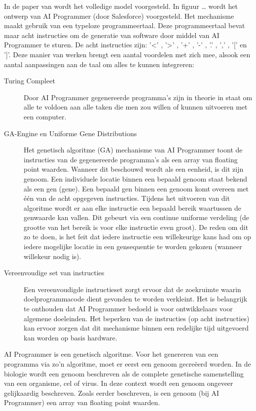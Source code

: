 In de paper van \textcite{aiProgrammer} wordt het volledige model voorgesteld. In figuur … wordt het ontwerp van AI Programmer (door Salesforce) voorgesteld. Het mechanisme maakt gebruik van een typeloze programmeertaal. Deze programmeertaal bevat maar acht instructies om de generatie van software door middel van AI Programmer te sturen. De acht instructies zijn: '<' , '>' , '+' , '-' , '.' , ',' , '[' en ']'. Deze manier van werken brengt een aantal voordelen met zich mee, alsook een aantal aanpassingen aan de taal om alles te kunnen integreren:
\begin{description}
	\item[Turing Compleet] Door AI Programmer gegenereerde programma’s zijn in theorie in staat om alle te voldoen aan alle taken die men zou willen of kunnen uitvoeren met een computer.
	\item[GA-Engine en Uniforme Gene Distributions] Het genetisch algoritme (GA) mechanisme van AI Programmer toont de instructies van de gegenereerde programma’s als een array van floating point waarden. Wanneer dit beschouwd wordt als een eenheid, is dit zijn genoom. Een individuele locatie binnen een bepaald genoom staat bekend als een gen (gene). Een bepaald gen binnen een genoom komt overeen met één van de acht opgegeven instructies. Tijdens het uitvoeren van dit algoritme wordt er aan elke instructie een bepaald bereik waartussen de genwaarde kan vallen. Dit gebeurt via een continue uniforme verdeling (de grootte van het bereik is voor elke instructie even groot). De reden om dit zo te doen, is het feit dat iedere instructie een willekeurige kans had om op iedere mogelijke locatie in een gensequentie te worden gekozen (wanneer willekeur nodig is).
	\item[Vereenvoudige set van instructies]  Een vereenvoudigde instructieset zorgt ervoor dat de zoekruimte waarin doelprogrammacode dient gevonden te worden verkleint. Het is belangrijk te onthouden dat AI Programmer bedoeld is voor ontwikkelaars voor algemene doeleinden. Het beperken van de instructies (op acht instructies) kan ervoor zorgen dat dit mechanisme binnen een redelijke tijd uitgevoerd kan worden op basis hardware.
\end{description}

AI Programmer is een genetisch algoritme. Voor het genereren van een programma via zo'n algoritme, moet er eerst een genoom gecreëerd worden. In de biologie wordt een genoom beschreven als de complete genetische samenstelling van een organisme, cel of virus. In deze context wordt een genoom ongeveer gelijkaardig beschreven. Zoals eerder beschreven, is een genoom (bij AI Programmer) een array van floating point waarden. 

